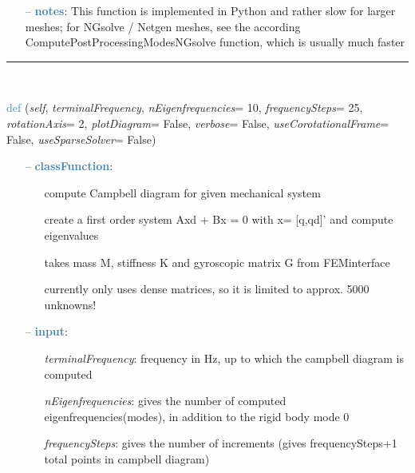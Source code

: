 \begin{itemize}[leftmargin=1.4cm]
\begin{itemize}[leftmargin=1.4cm]
\begin{itemize}[leftmargin=0.5cm]
\begin{itemize}[leftmargin=1.4cm]
\begin{itemize}[leftmargin=1.4cm]
\begin{itemize}[leftmargin=0.5cm]
\begin{itemize}[leftmargin=0.7cm]
\item[--]\textcolor{steelblue}{\bf notes}: This function is implemented in Python and rather slow for larger meshes; for NGsolve / Netgen meshes, see the according ComputePostProcessingModesNGsolve function, which is usually much faster
\vspace{12pt}\end{itemize}
%
\noindent\rule{8cm}{0.75pt}\vspace{1pt} \\ 
\begin{flushleft}
\noindent \textcolor{steelblue}{def {\bf {}}}\label{sec:FEM:FEMinterface:ComputeCampbellDiagram}
({\it self}, {\it terminalFrequency}, {\it nEigenfrequencies}= 10, {\it frequencySteps}= 25, {\it rotationAxis}= 2, {\it plotDiagram}= False, {\it verbose}= False, {\it useCorotationalFrame}= False, {\it useSparseSolver}= False)
\end{flushleft}
\setlength{\itemindent}{0.7cm}
\begin{itemize}[leftmargin=0.7cm]
\item[--]\textcolor{steelblue}{\bf classFunction}: \vspace{-6pt}
\begin{itemize}[leftmargin=1.2cm]
\setlength{\itemindent}{-0.7cm}
\item[]compute Campbell diagram for given mechanical system
\item[]create a first order system Axd + Bx = 0 with x= [q,qd]' and compute eigenvalues
\item[]takes mass M, stiffness K and gyroscopic matrix G from FEMinterface
\item[]currently only uses dense matrices, so it is limited to approx. 5000 unknowns!
\end{itemize}
\item[--]\textcolor{steelblue}{\bf input}: \vspace{-6pt}
\begin{itemize}[leftmargin=1.2cm]
\setlength{\itemindent}{-0.7cm}
\item[]{\it terminalFrequency}: frequency in Hz, up to which the campbell diagram is computed
\item[]{\it nEigenfrequencies}: gives the number of computed eigenfrequencies(modes), in addition to the rigid body mode 0
\item[]{\it frequencySteps}: gives the number of increments (gives frequencySteps+1 total points in campbell diagram)

\end{itemize}
\end{itemize}
\end{itemize}
\end{itemize}
\end{itemize}
\end{itemize}
\end{itemize}
\end{itemize}

